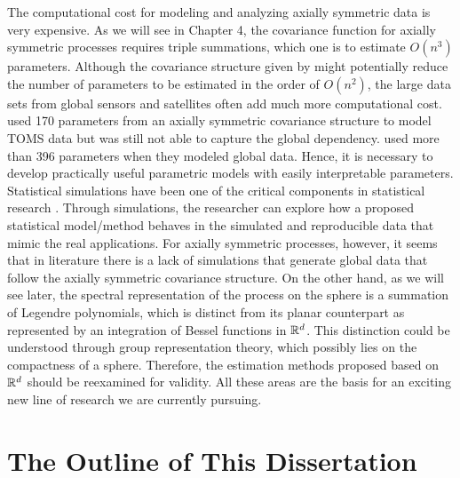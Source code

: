 The computational cost for modeling and analyzing axially symmetric data is very expensive. As we will see in Chapter 4, the covariance function for axially symmetric processes requires triple summations, which one is to estimate $O(n^3)$ parameters. Although the covariance structure given by \cite{Huang2012} might potentially reduce the number of parameters to be estimated in the order of $O(n^2)$, the large data sets from global sensors and satellites often add much more computational cost. \cite{Stein2007} used 170 parameters from an axially symmetric covariance structure to model TOMS data but was still not able to capture the global dependency. \cite{CressieJohannesson2008} used more than 396 parameters when they modeled global data. Hence, it is necessary to develop practically useful parametric models with easily interpretable parameters. \\

Statistical simulations have been one of the critical components in statistical research . Through simulations, the researcher can explore how a proposed statistical model/method behaves in the simulated and reproducible data that mimic the real applications. For axially symmetric processes, however, it seems that in literature there is a lack of simulations that generate global data that follow the axially symmetric covariance structure. On the other hand, as we will see later, the spectral representation of the process on the sphere is a summation of Legendre polynomials, which is distinct from its planar counterpart as represented by an integration of Bessel functions in $\mathbb{R}^d$. This distinction could be understood through group representation theory, which possibly lies on the compactness of a sphere. Therefore, the estimation methods proposed based on $\mathbb{R}^d$ should be reexamined for validity. All these areas are the basis for an exciting new line of research we are currently pursuing.\\

\section{The Outline of This Dissertation}

